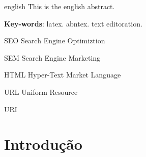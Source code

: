 \documentclass[
	12pt,				%
	openright,			%
	twoside,			%
	a4paper,			%
	english,			%
	french,				%
	spanish,			%
	brazil				%
	]{abntex2}
\begin{document}
\begin{resumo}[Abstract]
 \begin{otherlanguage*}{english}
   This is the english abstract.

   \vspace{\onelineskip}
 
   \noindent 
   \textbf{Key-words}: latex. abntex. text editoration.
 \end{otherlanguage*}
\end{resumo}

\listoffigures*
\cleardoublepage

\listoftables*
\cleardoublepage

\begin{siglas}
  \item[SEO] Search Engine Optimiztion
  \item[SEM] Search Engine Marketing
  \item[HTML] Hyper-Text Market Language
  \item[URL] Uniform Resource 
  \item[URI]
\end{siglas}


\tableofcontents*
\cleardoublepage



\textual

\chapter*[Introdução]{Introdução}
\end{document}
